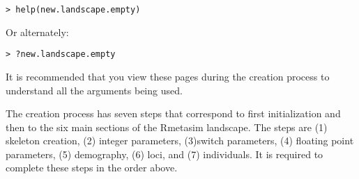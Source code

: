 \documentclass{article}
\begin{document}
\begin{verbatim}
> help(new.landscape.empty)
\end{verbatim}

Or alternately:

\begin{verbatim}
> ?new.landscape.empty
\end{verbatim}

It is recommended that you view these pages during the creation process to understand all the arguments being used.

The creation process has seven steps that correspond to first initialization and then to the six main sections of the Rmetasim landscape.  The steps are (1) skeleton creation, (2) integer parameters, (3)switch parameters, (4) floating point parameters, (5) demography, (6) loci, and (7) individuals.  It is required to complete these steps in the order above.
\end{document}
